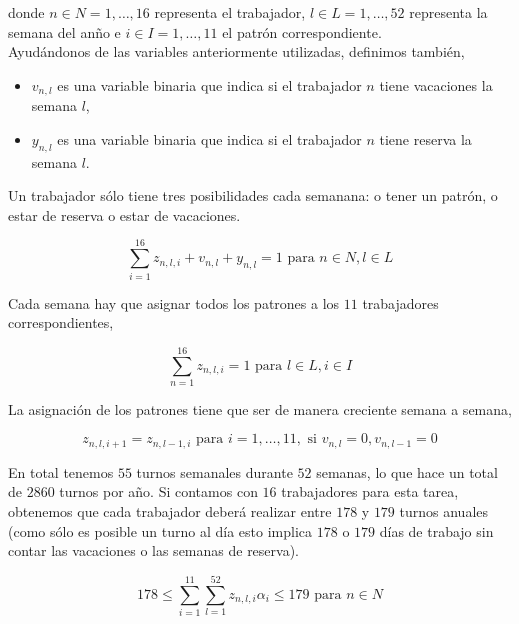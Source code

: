 \documentclass[a4paper,12pt]{article}
\begin{document}
donde $n\in N = {1,\dots,16}$ representa el trabajador, $l\in L={1,\dots,52}$ representa la semana del an\~no e $i\in I = {1,\dots,11}$ el patr\'on correspondiente.\\

Ayud\'andonos de las variables anteriormente utilizadas, definimos tambi\'en,\\

\begin{itemize}
\item[] $v_{n,l}$ es una variable binaria que indica si el trabajador $n$ tiene vacaciones la semana $l$,\\
\item[] $y_{n,l}$ es una variable binaria que indica si el trabajador $n$ tiene reserva la semana $l$.\\
\end{itemize}

Un trabajador s\'olo tiene tres posibilidades cada semanana: o tener un patr\'on, o estar de reserva o estar de vacaciones.

$$ \sum_{i=1}^{16} z_{n,l,i} + v_{n,l} + y_{n,l} = 1 \text{ para } n\in N, l\in L$$ 


Cada semana hay que asignar todos los patrones a los $11$ trabajadores correspondientes,

$$ \sum_{n=1}^{16} z_{n,l,i} = 1 \text{ para } l\in L, i\in I$$

La asignaci\'on de los patrones tiene que ser de manera creciente semana a semana,

$$ z_{n,l,i+1} = z_{n,l-1,i} \text{ para } i=1,\dots,11, \text{ si } v_{n,l} = 0, v_{n,l-1} = 0$$


En total tenemos $55$ turnos semanales durante $52$ semanas, lo que hace un total de $2860$ turnos por a\~no. Si contamos con $16$ trabajadores para esta tarea, obtenemos que cada trabajador deber\'a realizar entre $178$ y $179$ turnos anuales (como s\'olo es posible un turno al d\'ia esto implica $178$ o $179$ d\'ias de trabajo sin contar las vacaciones o las semanas de reserva). 

$$ 178 \leq \sum_{i=1}^{11} \sum_{l=1}^{52} z_{n,l,i} \alpha_{i} \leq 179 \text{ para } n\in N $$
\end{document}
